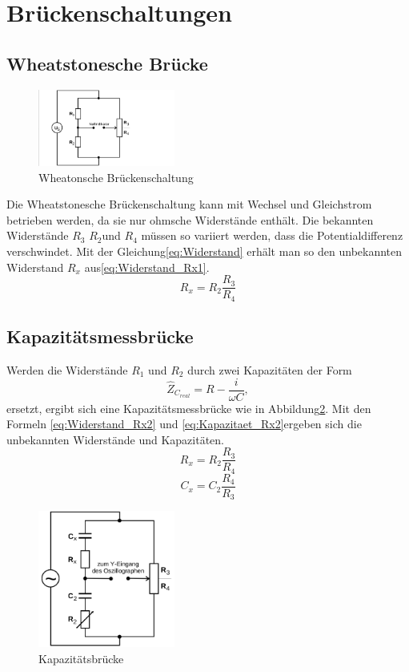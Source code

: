 \section{Brückenschaltungen}
\subsection{Wheatstonesche Brücke}
\begin{figure}
  \centering
  \includegraphics[width=0.4\textwidth]{Bilder/Wheatonsche.png}
  \caption{Wheatonsche Brückenschaltung}
  \label{fig:wheatonsche}
\end{figure}
Die Wheatstonesche Brückenschaltung kann mit Wechsel und Gleichstrom betrieben werden,
da sie nur ohmsche Widerstände enthält. Die bekannten Widerstände $R_3$ $R_2$und $R_4$
 müssen so variiert werden, dass die Potentialdifferenz verschwindet. Mit der
Gleichung\eqref{eq:Widerstand} erhält man so den unbekannten Widerstand $R_x$
aus\eqref{eq:Widerstand_Rx1}.
\begin{equation}
R_x=R_2 \frac{R_3}{R_4}
\label{eq:Widerstand_Rx1}
\end{equation}
\subsection{Kapazitätsmessbrücke}
Werden die Widerstände $R_1$ und $R_2$ durch zwei Kapazitäten der Form
\begin{equation}
\hat{Z}_{C_{real}}=R-\frac{i}{\omega C}  ,
\end{equation}
ersetzt, ergibt sich eine Kapazitätsmessbrücke wie in Abbildung\ref{fig:capbruecke}.
Mit den Formeln \eqref{eq:Widerstand_Rx2} und \eqref{eq:Kapazitaet_Rx2}ergeben
sich die unbekannten Widerstände und Kapazitäten.
\begin{equation}
R_x=R_2\frac{R_3}{R_4}
\label{eq:Widerstand_Rx2}
\end{equation}
\begin{equation}
C_x=C_2\frac{R_4}{R_3}
\label{eq:Kapazitaet_Rx2}
\end{equation}
\begin{figure}
  \centering
  \includegraphics[width=0.4\textwidth]{Bilder/Capazitaetsbruecke.png}
  \caption{Kapazitätsbrücke}
  \label{fig:capbruecke}
\end{figure}
